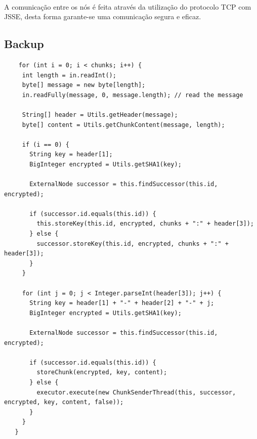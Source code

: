 \documentclass[11pt,oneside]{book}
\begin{document}
\paragraph{}

A comunicação entre os nós é feita através da utilização do protocolo TCP com JSSE, desta forma
garante-se uma comunicação segura e eficaz. 

\subsection{Backup}

\begin{lstlisting}
    for (int i = 0; i < chunks; i++) {
     int length = in.readInt();
     byte[] message = new byte[length];
     in.readFully(message, 0, message.length); // read the message

     String[] header = Utils.getHeader(message);
     byte[] content = Utils.getChunkContent(message, length);

     if (i == 0) {
       String key = header[1];
       BigInteger encrypted = Utils.getSHA1(key);

       ExternalNode successor = this.findSuccessor(this.id, encrypted);

       if (successor.id.equals(this.id)) {
         this.storeKey(this.id, encrypted, chunks + ":" + header[3]);
       } else {
         successor.storeKey(this.id, encrypted, chunks + ":" + header[3]);
       }
     }

     for (int j = 0; j < Integer.parseInt(header[3]); j++) {
       String key = header[1] + "-" + header[2] + "-" + j;
       BigInteger encrypted = Utils.getSHA1(key);

       ExternalNode successor = this.findSuccessor(this.id, encrypted);

       if (successor.id.equals(this.id)) {
         storeChunk(encrypted, key, content);
       } else {
         executor.execute(new ChunkSenderThread(this, successor, encrypted, key, content, false));
       }
     }
   }

\end{lstlisting}

\paragraph{}
\end{document}

